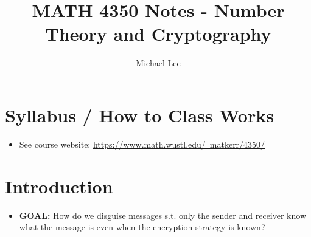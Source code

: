\documentclass[11pt]{article}
\title{MATH 4350 Notes - Number Theory and Cryptography}
\author{Michael Lee}
\begin{document}
\maketitle

\tableofcontents
\newpage

\section{Syllabus / How to Class Works}
\begin{itemize}
    \item See course website: \href{https://www.math.wustl.edu/~matkerr/4350/}{https://www.math.wustl.edu/~matkerr/4350/}
\end{itemize}

\section{Introduction}
\begin{itemize}
    \item \textbf{GOAL:} How do we disguise messages s.t. only the sender and receiver know what the message is even when the encryption strategy is known?
\end{itemize}
\end{document}
